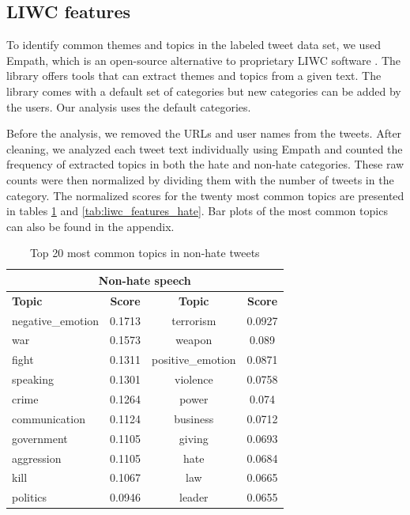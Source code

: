 \documentclass[conference]{IEEEtran}
\begin{document}
\subsection{LIWC features}
To identify common themes and topics in the labeled tweet data set, we 
used Empath, which is an open-source alternative to proprietary LIWC software  \cite{fast2016empath}. 
The library offers tools that can extract themes and topics from a given text.
The library comes with a default set of categories but new categories can be added by the users. 
Our analysis uses the default categories.

Before the analysis, we removed the URLs and user names from the tweets. After cleaning, we analyzed each tweet text individually using Empath and counted the frequency of extracted topics in both the hate and non-hate categories. 
These raw counts were then normalized by dividing them with the number of tweets in the category. The normalized 
scores for the twenty most common topics are presented in tables \ref{tab:liwc_features_non_hate} 
and \ref{tab:liwc_features_hate}. Bar plots of the most common topics can also be found in the appendix.

\begin{table}[!ht]
    \def\arraystretch{1.2}%
    \begin{center}
      \caption{Top 20 most common topics in non-hate tweets}
      \label{tab:liwc_features_non_hate}
      \begin{tabular}{l c | c c}
        \hline\hline
        \multicolumn{4}{c}{\textbf{Non-hate speech}}\\
        \hline
        \textbf{Topic}&\textbf{Score}&\textbf{Topic}&\textbf{Score}\\
        \hline
        negative\_emotion&0.1713&terrorism&0.0927\\
        war&0.1573&weapon&0.089\\
        fight&0.1311&positive\_emotion&0.0871\\
        speaking&0.1301&violence&0.0758\\
        crime&0.1264&power&0.074\\
        communication&0.1124&business&0.0712\\
        government&0.1105&giving&0.0693\\
        aggression&0.1105&hate&0.0684\\
        kill&0.1067&law&0.0665\\
        politics&0.0946&leader&0.0655\\
        \hline\hline
      \end{tabular}  
    \end{center}
  \end{table}
\end{document}
